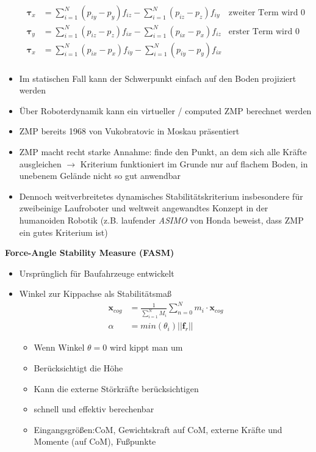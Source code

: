 \begin{itemize}
\begin{align*}
\mathbf{\tau}_x &= \sum\limits_{i=1}^N(p_{iy}-p_y)f_{iz} - \sum\limits_{i=1}^N(p_{iz}-p_z)f_{iy} &\text{zweiter Term wird 0}\\
\mathbf{\tau}_y &= \sum\limits_{i=1}^N(p_{iz}-p_z)f_{ix} - \sum\limits_{i=1}^N(p_{ix}-p_x)f_{iz} &\text{erster Term wird 0}\\
\mathbf{\tau}_x &= \sum\limits_{i=1}^N(p_{ix}-p_x)f_{iy} - \sum\limits_{i=1}^N(p_{iy}-p_y)f_{ix}\\
\end{align*}
\item Im statischen Fall kann der Schwerpunkt einfach auf den Boden projiziert werden
\item Über Roboterdynamik kann ein virtueller / computed ZMP berechnet werden
\item ZMP bereits 1968 von Vukobratovic in Moskau präsentiert
\item ZMP macht recht starke Annahme: finde den Punkt, an dem sich alle Kräfte  ausgleichen $\rightarrow$ Kriterium funktioniert im Grunde nur auf flachem Boden, in unebenem Gelände nicht so gut anwendbar
\item Dennoch weitverbreitetes dynamisches Stabilitätskriterium insbesondere für zweibeinige Laufroboter und weltweit angewandtes Konzept in der humanoiden Robotik (z.B. laufender \textit{ASIMO} von Honda beweist, dass ZMP ein gutes Kriterium ist)
\end{itemize}
\textbf{Force-Angle Stability Measure (FASM)}
\begin{itemize}
\item Ursprünglich für Baufahrzeuge entwickelt
\item Winkel zur Kippachse als Stabilitätsmaß\\
\begin{align*}
\mathbf{x}_{cog} &= \frac{1}{\sum_{i=1}^N M_i} \sum\limits_{n=0}^N m_i \cdot \mathbf{x}_{cog}\\
\alpha &= min(\theta_i)||\mathbf{f}_r||
\end{align*}
\begin{itemize}
\item Wenn Winkel $\theta = 0$ wird kippt man um
\item Berücksichtigt die Höhe
\item Kann die externe Störkräfte berücksichtigen
\item schnell und effektiv berechenbar
\item Eingangsgrößen:CoM, Gewichtskraft auf CoM, externe Kräfte und Momente (auf CoM), Fußpunkte
\end{itemize}
\end{itemize}
